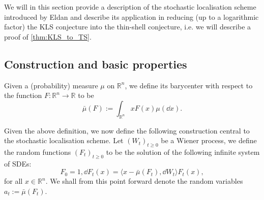 We will in this section provide a description of the stochastic localisation scheme introduced by 
Eldan \cite{Eldan_2013} and describe its application in reducing (up to a logarithmic factor) the 
KLS conjecture into the thin-shell conjecture, i.e. we will describe a proof of \ref{thm:KLS_to_TS}.



\subsection{Construction and basic properties}

\begin{definition}[Barycenter]
  Given a (probability) measure \(\mu\) on \(\mathbb{R}^n\), we define 
  its barycenter with respect to the function \(F : \mathbb{R}^n \to \mathbb{R}\) to be
  \[\bar{\mu}(F) := \int_{\mathbb{R}^n} x F(x) \mu(\dd x).\]
\end{definition}

Given the above definition, we now define the following construction central to the stochastic 
localisation scheme. Let \((W_t)_{t \ge 0}\) be a Wiener process, we define the random functions 
\((F_t)_{t \ge 0}\) to be the solution of the following infinite system of SDEs: 
\begin{equation}\label{eq:stoch_loc}
  F_0 = 1, \dd F_t(x) = \langle x - \bar{\mu}(F_t), \dd W_t \rangle F_t(x),
\end{equation}
for all \(x \in \mathbb{R}^n\). We shall from this point forward denote the random variables 
\(a_t := \bar{\mu}(F_t)\).

